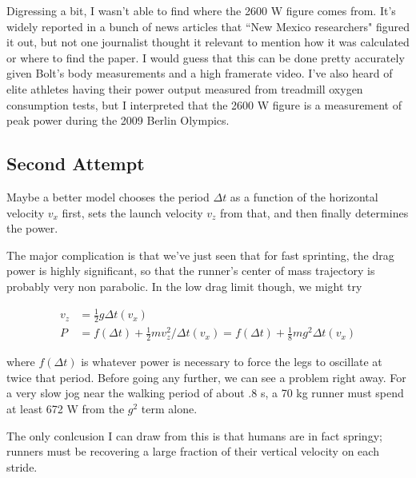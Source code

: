 \documentclass[12pt]{article}
\begin{document}
Digressing a bit, I wasn't able to find where the 2600 W figure comes from. It's widely reported in a bunch of news articles that ``New Mexico researchers" figured it out, but not one journalist thought it relevant to mention how it was calculated or where to find the paper. I would guess that this can be done pretty accurately given Bolt's body measurements and a high framerate video. I've also heard of elite athletes having their power output measured from treadmill oxygen consumption tests, but I interpreted that the 2600 W figure is a measurement of peak power during the 2009 Berlin Olympics.

\subsection{Second Attempt}

Maybe a better model chooses the period \(\Delta t\) as a function of the horizontal velocity \(v_x\) first, sets the launch velocity \(v_z\) from that, and then finally determines the power.

The major complication is that we've just seen that for fast sprinting, the drag power is highly significant, so that the runner's center of mass trajectory is probably very non parabolic. In the low drag limit though, we might try

\begin{align*}
v_z &= \frac{1}{2}g\Delta t(v_x) \\[11pt]
P &= f(\Delta t) + \frac{1}{2}m v_z^2 / \Delta t(v_x) = f(\Delta t) + \frac{1}{8}mg^2\Delta t(v_x)
\end{align*}

where \(f(\Delta t)\) is whatever power is necessary to force the legs to oscillate at twice that period. Before going any further, we can see a problem right away. For a very slow jog near the walking period of about .8 s, a 70 kg runner must spend at least 672 W from the \(g^2\) term alone.

The only conlcusion I can draw from this is that humans are in fact springy; runners must be recovering a large fraction of their vertical velocity on each stride.
\end{document}
